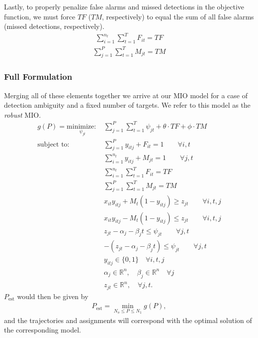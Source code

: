 Lastly, to properly penalize false alarms and missed detections in the objective function, we must force $TF$ ($TM$, respectively) to equal the sum of all false alarms (missed detections, respectively).
\begin{align*}
\sum_{i=1}^{n_{t}} \sum_{t=1}^{T} F_{it} = TF
\end{align*}
\begin{align}\label{eqn: MD Total}
\sum_{j=1}^{P} \sum_{t=1}^{T} M_{jt} = TM 
\end{align}

\subsubsection{Full Formulation}
Merging all of these elements together we arrive at our MIO model for a case of detection ambiguity and a fixed number of targets. We refer to this model as the \textit{robust} MIO. 
\begin{align}
g(P)=\underset{\psi_{jt}}{\text{minimize: }} & \sum_{j=1}^{P} \sum_{t=1}^{T} \psi_{jt} + \theta \cdot TF + \phi \cdot TM \label{eq:simple_robust}\\
\text{subject to: }	& \sum_{j=1}^{P} y_{itj} + F_{it} = 1 \qquad \forall i,t \nonumber \\
				& \sum_{i=1}^{n_{t}} y_{itj} + M_{jt} = 1 \qquad \forall j,t \nonumber\\
				& \sum_{i=1}^{n_{t}} \sum_{t=1}^{T} F_{it} = TF \nonumber \\
				& \sum_{j=1}^{P} \sum_{t=1}^{T} M_{jt} = TM \nonumber \\
				& x_{it}y_{itj} + M_{t}(1-y_{itj}) \geq z_{jt} \qquad \forall i,t,j \nonumber \\
				& x_{it}y_{itj} - M_{t}(1-y_{itj}) \leq z_{jt} \qquad \forall i,t,j \nonumber \\
				& z_{jt} - \alpha_{j} - \beta_{j}t \leq \psi_{jt} \qquad \forall j,t \nonumber \\
				& -(z_{jt} - \alpha_{j} - \beta_{j}t) \leq \psi_{jt} \qquad \forall j,t \nonumber \\
				& y_{itj} \in \{0,1\} \quad \forall i,t,j \nonumber \\
				& \alpha_{j} \in \mathbb{R}^n,\quad \beta_{j} \in \mathbb{R}^n \quad \forall j \nonumber\\
				& z_{jt} \in \mathbb{R}^n, \quad \forall j,t. \nonumber
\end{align}
$P_\text{est}$ would then be given by
\begin{align*}
P_\text{est}=\min_{N_o\leq P\leq N_1} g(P),
\end{align*}
and the trajectories and assignments will correspond with the optimal solution of the corresponding model.

